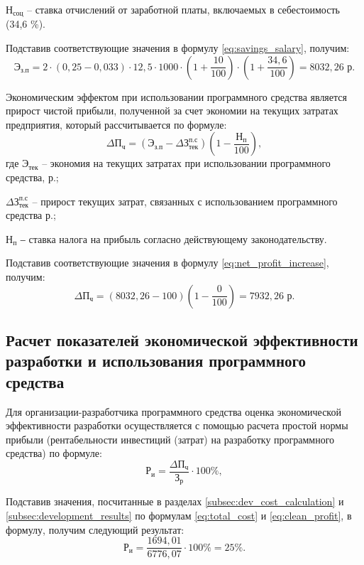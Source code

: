\hspace{-0.9em}$\mathrm{Н_{соц}}$ – ставка отчислений от заработной платы, включаемых в себестоимость (34,6 \%).

Подставив соответствующие значения в формулу \ref{eq:savings_salary}, получим:
\[
\mathrm{Э_{з.п}} = 2 \cdot (0{,}25 - 0{,}033 ) \cdot 12{,}5 \cdot 1000 \cdot \left(1 + \frac{10}{100}\right) \cdot \left(1 + \frac{34{,}6}{100}\right) = 8032{,}26  \text{ р}.
\]

Экономическим эффектом при использовании программного средства является прирост чистой прибыли, полученной за счет экономии на текущих затратах предприятия, который рассчитывается по формуле:
\begin{equation}
	\label{eq:net_profit_increase}
	\Delta \mathrm{П_{ч}} = (\mathrm{Э_{з.п}} - \Delta \text{З}_\text{тек}^{\text{п.с}}) \left( 1 - \frac{\mathrm{Н_{п}}}{100} \right),
\end{equation}
где $\mathrm{Э_{тек}}$ – экономия на текущих затратах при использовании программного средства, р.;

\hspace{-0.9em}$\Delta \text{З}_\text{тек}^{\text{п.с}}$ – прирост текущих затрат, связанных с использованием программного средства р.; 

\hspace{-0.9em}$\mathrm{Н_{п}}$ ‒ ставка налога на прибыль согласно действующему законодательству.

Подставив соответствующие значения в формулу \ref{eq:net_profit_increase}, получим:
\[
\Delta \mathrm{П_{ч}} = (8032{,}26 - 100) \left(1 - \frac{0}{100}\right) = 7932{,}26 \text{ р}.
\]

\subsection{Расчет показателей экономической эффективности разработки и использования программного средства} 

Для организации-разработчика программного средства оценка экономической эффективности разработки осуществляется с помощью расчета простой нормы прибыли (рентабельности инвестиций (затрат) на разработку программного средства) по формуле:
\begin{equation}
	\label{eq:roi}
	\mathrm{Р_{и}} = \frac{\Delta \mathrm{П_{ч}}}{\mathrm{З_{р}}} \cdot 100\%,
\end{equation}

Подставив значения, посчитанные в разделах \ref{subsec:dev_cost_calculation} и \ref{subsec:development_results}   по формулам \ref{eq:total_cost} и \ref{eq:clean_profit}, в формулу, получим следующий результат:
\[
\mathrm{Р_{и}} = \frac{1694{,}01}{6776{,}07} \cdot 100\% = 25\%.
\]

